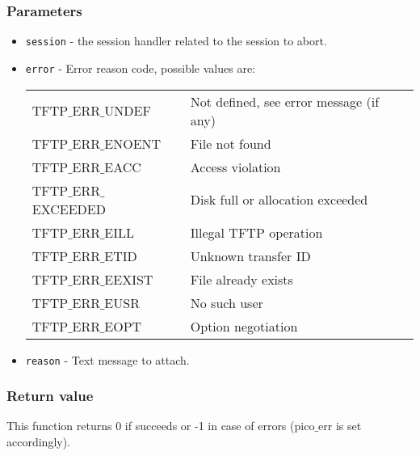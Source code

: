\subsubsection*{Parameters}
\begin{itemize}[noitemsep]
\item \texttt{session} - the session handler related to the session to abort.
\item \texttt{error} - Error reason code, possible values are:

\begin{tabular}{ll}
TFTP$\_$ERR$\_$UNDEF & Not defined, see error message (if any) \\
TFTP$\_$ERR$\_$ENOENT & File not found \\
TFTP$\_$ERR$\_$EACC & Access violation \\
TFTP$\_$ERR$\_$EXCEEDED & Disk full or allocation exceeded \\
TFTP$\_$ERR$\_$EILL & Illegal TFTP operation \\
TFTP$\_$ERR$\_$ETID & Unknown transfer ID \\
TFTP$\_$ERR$\_$EEXIST & File already exists \\
TFTP$\_$ERR$\_$EUSR & No such user \\
TFTP$\_$ERR$\_$EOPT & Option negotiation \\
\end{tabular}
\item \texttt{reason} - Text message to attach.
\end{itemize}

\subsubsection*{Return value}
This function returns 0 if succeeds or -1 in case of errors (pico$\_$err is set accordingly).

